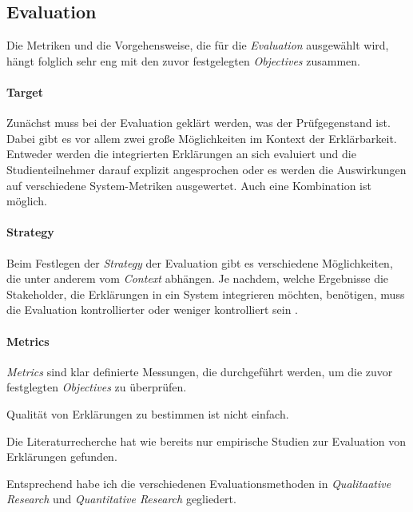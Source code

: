 \subsection{Evaluation}
\label{sec:model_evaluation}

Die Metriken und die Vorgehensweise, die für die \textit{Evaluation} ausgewählt wird, hängt folglich sehr eng mit den zuvor festgelegten \textit{Objectives} zusammen.

\paragraph{Target} Zunächst muss bei der Evaluation geklärt werden, was der Prüfgegenstand ist. Dabei gibt es vor allem zwei große Möglichkeiten im Kontext der Erklärbarkeit. Entweder werden die integrierten Erklärungen an sich evaluiert und die Studienteilnehmer darauf explizit angesprochen oder es werden die Auswirkungen auf verschiedene System-Metriken ausgewertet. Auch eine Kombination ist möglich.

\paragraph{Strategy} Beim Festlegen der \textit{Strategy} der Evaluation gibt es verschiedene Möglichkeiten, die unter anderem vom \textit{Context} abhängen. Je nachdem, welche Ergebnisse die Stakeholder, die Erklärungen in ein System integrieren möchten, benötigen, muss die Evaluation kontrollierter oder weniger kontrolliert sein \cite[vgl.][]{wohlin2012experimentation}.

\paragraph{Metrics} \textit{Metrics} sind klar definierte Messungen, die durchgeführt werden, um die zuvor festglegten \textit{Objectives} zu überprüfen.




Qualität von Erklärungen zu bestimmen ist nicht einfach.

Die Literaturrecherche hat wie bereits \cite{nunes_systematic_2017} nur empirische Studien zur Evaluation von Erklärungen gefunden.

Entsprechend \cite{wohlin2012experimentation} habe ich die verschiedenen Evaluationsmethoden in \textit{Qualitaative Research} und \textit{Quantitative Research} gegliedert.

